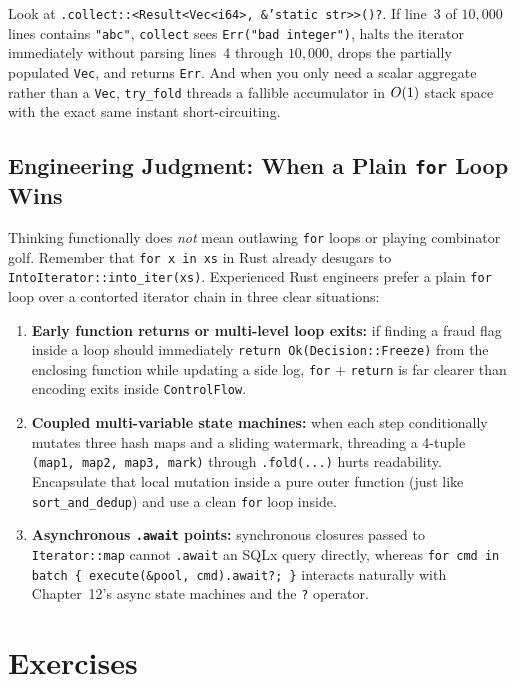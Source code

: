 Look at \texttt{.collect::<Result<Vec<i64>, \&'static str>>()?}. If line~3 of
$10{,}000$ lines contains \texttt{"abc"}, \texttt{collect} sees \texttt{Err("bad integer")},
halts the iterator immediately without parsing lines~4 through $10{,}000$, drops the
partially populated \texttt{Vec}, and returns \texttt{Err}. And when you only need a
scalar aggregate rather than a \texttt{Vec}, \texttt{try\_fold} threads a fallible
accumulator in $O(1)$ stack space with the exact same instant short-circuiting.

\subsection{Engineering Judgment: When a Plain \texttt{for} Loop Wins}

Thinking functionally does \emph{not} mean outlawing \texttt{for} loops or playing
combinator golf. Remember that \texttt{for x in xs} in Rust already desugars to
\texttt{IntoIterator::into\_iter(xs)}. Experienced Rust engineers prefer a plain
\texttt{for} loop over a contorted iterator chain in three clear situations:
\begin{enumerate}
  \item \textbf{Early function returns or multi-level loop exits:} if finding a fraud
    flag inside a loop should immediately \texttt{return Ok(Decision::Freeze)} from
    the enclosing function while updating a side log, \texttt{for} + \texttt{return}
    is far clearer than encoding exits inside \texttt{ControlFlow}.
  \item \textbf{Coupled multi-variable state machines:} when each step conditionally
    mutates three hash maps and a sliding watermark, threading a 4-tuple
    \texttt{(map1, map2, map3, mark)} through \texttt{.fold(...)} hurts readability.
    Encapsulate that local mutation inside a pure outer function (just like
    \texttt{sort\_and\_dedup}) and use a clean \texttt{for} loop inside.
  \item \textbf{Asynchronous \texttt{.await} points:} synchronous closures passed to
    \texttt{Iterator::map} cannot \texttt{.await} an SQLx query directly, whereas
    \texttt{for cmd in batch \{ execute(\&pool, cmd).await?; \}} interacts naturally
    with Chapter~12's async state machines and the \texttt{?} operator.
\end{enumerate}

\section{Exercises}
\label{ch07:exercises}

